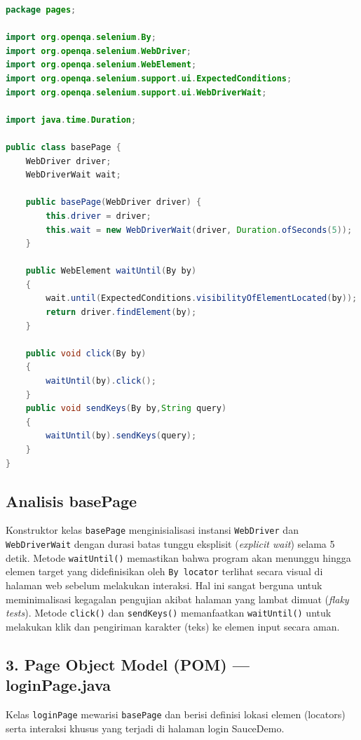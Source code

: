 \documentclass[a4paper,oneside,11pt]{book}
\begin{document}
\begin{lstlisting}[language=Java, caption=Kelas basePage.java]
package pages;

import org.openqa.selenium.By;
import org.openqa.selenium.WebDriver;
import org.openqa.selenium.WebElement;
import org.openqa.selenium.support.ui.ExpectedConditions;
import org.openqa.selenium.support.ui.WebDriverWait;

import java.time.Duration;

public class basePage {
    WebDriver driver;
    WebDriverWait wait;

    public basePage(WebDriver driver) {
        this.driver = driver;
        this.wait = new WebDriverWait(driver, Duration.ofSeconds(5));
    }

    public WebElement waitUntil(By by)
    {
        wait.until(ExpectedConditions.visibilityOfElementLocated(by));
        return driver.findElement(by);
    }

    public void click(By by)
    {
        waitUntil(by).click();
    }
    public void sendKeys(By by,String query)
    {
        waitUntil(by).sendKeys(query);
    }
}
\end{lstlisting}

\subsection{Analisis basePage}
Konstruktor kelas \texttt{basePage} menginisialisasi instansi \texttt{WebDriver} dan \texttt{WebDriverWait} dengan durasi batas tunggu eksplisit (\textit{explicit wait}) selama 5 detik. 
Metode \texttt{waitUntil()} memastikan bahwa program akan menunggu hingga elemen target yang didefinisikan oleh \texttt{By locator} terlihat secara visual di halaman web sebelum melakukan interaksi. Hal ini sangat berguna untuk meminimalisasi kegagalan pengujian akibat halaman yang lambat dimuat (\textit{flaky tests}). 
Metode \texttt{click()} dan \texttt{sendKeys()} memanfaatkan \texttt{waitUntil()} untuk melakukan klik dan pengiriman karakter (teks) ke elemen input secara aman.

\subsection{3. Page Object Model (POM) — loginPage.java}
Kelas \texttt{loginPage} mewarisi \texttt{basePage} dan berisi definisi lokasi elemen (locators) serta interaksi khusus yang terjadi di halaman login SauceDemo.
\end{document}
